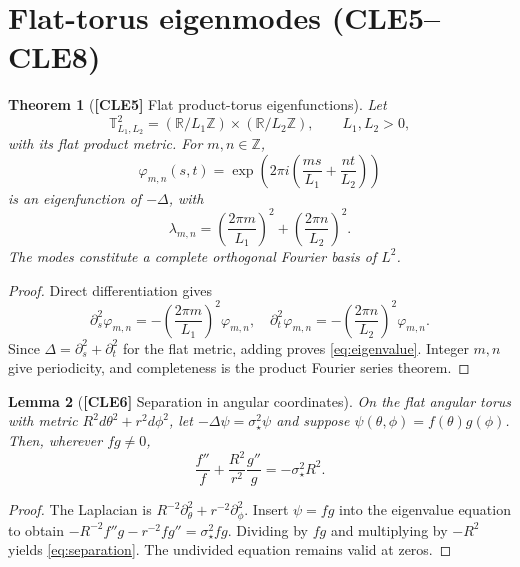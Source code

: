 \documentclass[11pt,letterpaper]{article}
\newtheorem{theorem}{Theorem}[section]
\newtheorem{lemma}[theorem]{Lemma}
\theoremstyle{definition}
\theoremstyle{remark}
\newcommand{\R}{\mathbb R}
\newcommand{\Z}{\mathbb Z}
\newcommand{\T}{\mathbb T}
\newcommand{\id}[1]{\textnormal{\textbf{[#1]}}}
\begin{document}
\section{Flat-torus eigenmodes (CLE5--CLE8)}
\begin{theorem}[\id{CLE5} Flat product-torus eigenfunctions]\label{thm:torusspectrum}
Let
\begin{equation*}
\T^2_{L_1,L_2}=(\R/L_1\Z)\times(\R/L_2\Z),
\qquad L_1,L_2>0,
\end{equation*}
with its flat product metric. For $m,n\in\Z$,
\begin{equation}\label{eq:torusmode}
\varphi_{m,n}(s,t)=\exp\left(2\pi i\left(\frac{ms}{L_1}
+\frac{nt}{L_2}\right)\right)
\end{equation}
is an eigenfunction of $-\Delta$, with
\begin{equation}\label{eq:eigenvalue}
\boxed{\lambda_{m,n}=\left(\frac{2\pi m}{L_1}\right)^2
+\left(\frac{2\pi n}{L_2}\right)^2}.
\end{equation}
The modes constitute a complete orthogonal Fourier basis of $L^2$.
\end{theorem}
\begin{proof}
Direct differentiation gives
\begin{equation*}
\partial_s^2\varphi_{m,n}=-\left(\frac{2\pi m}{L_1}\right)^2\varphi_{m,n},
\quad
\partial_t^2\varphi_{m,n}=-\left(\frac{2\pi n}{L_2}\right)^2\varphi_{m,n}.
\end{equation*}
Since $\Delta=\partial_s^2+\partial_t^2$ for the flat metric,
adding proves \eqref{eq:eigenvalue}. Integer $m,n$ give periodicity,
and completeness is the product Fourier series theorem.
\end{proof}

\begin{lemma}[\id{CLE6} Separation in angular coordinates]\label{lem:separation}
On the flat angular torus with metric $R^2d\theta^2+r^2d\phi^2$,
let $-\Delta\psi=\sigma_\star^2\psi$ and suppose
$\psi(\theta,\phi)=f(\theta)g(\phi)$.
Then, wherever $fg\ne0$,
\begin{equation}\label{eq:separation}
\boxed{\frac{f''}{f}+\frac{R^2}{r^2}\frac{g''}{g}
=-\sigma_\star^2R^2}.
\end{equation}
\end{lemma}
\begin{proof}
The Laplacian is $R^{-2}\partial_\theta^2+r^{-2}\partial_\phi^2$.
Insert $\psi=fg$ into the eigenvalue equation to obtain
$-R^{-2}f''g-r^{-2}fg''=\sigma_\star^2fg$.
Dividing by $fg$ and multiplying by $-R^2$ yields
\eqref{eq:separation}. The undivided equation remains valid at zeros.
\end{proof}
\end{document}
